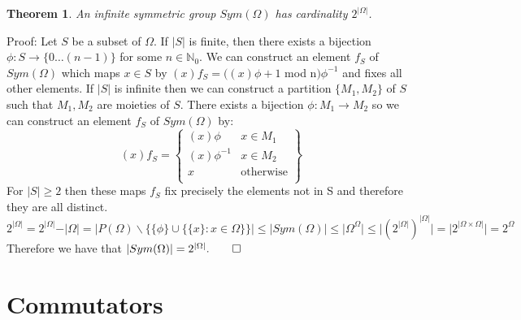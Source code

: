 \documentclass{report}
\newtheorem{theorem}{Theorem}[section]
\begin{document}
\begin{theorem}\label{big}
An infinite symmetric group $Sym(\Omega)$ has cardinality $2^{\vert \Omega \vert}$.
\end{theorem}\par
Proof: Let $S$ be a subset of $\Omega$. If $\vert S \vert$ is finite, then there exists a bijection $\phi:S \rightarrow \{0 \ldots (n-1)\}$ for some $n \in \mathbb{N}_0$. We can construct an element $f_S$ of $Sym(\Omega)$ which maps $x\in S$ by $(x)f_S=((x)\phi + 1 $ mod n$)\phi^{-1}$ and fixes all other elements. If $\vert S \vert$ is infinite then we can construct a partition $\{M_1,M_2\}$ of $S$ such that $M_1,M_2$ are moieties of $S$. There exists a bijection $\phi:M_1 \rightarrow M_2$ so we can construct an element $f_S$ of $Sym(\Omega)$ by:
\[(x)f_S =  \left\{
    \begin{array}{lr}
      (x)\phi&  x\in M_1  \\
      (x)\phi^{-1}& x\in M_2\\
      x& \text{otherwise}\\
    \end{array}
    \right\}\]
For $\vert S\vert \geq 2$ then these maps $f_S$ fix precisely the elements not in S and therefore they are all distinct.
\[2^{\vert \Omega \vert} = 2^{\vert \Omega \vert} - \vert\Omega\vert = \vert P(\Omega) \backslash \{\{\phi\}\cup \{\{x\}:x\in \Omega\}\} \vert \leq\vert Sym(\Omega)\vert \leq \vert \Omega^{\Omega}\vert \leq \vert (2^{\vert \Omega \vert})^{\vert \Omega \vert} \vert=\vert 2^{\vert \Omega \times \Omega \vert} \vert=2^{\Omega}\]
  Therefore we have that $\vert Sym(\Omega)\vert=2^{\vert \Omega \vert}.\qed$
\chapter{Commutators}
\end{document}
